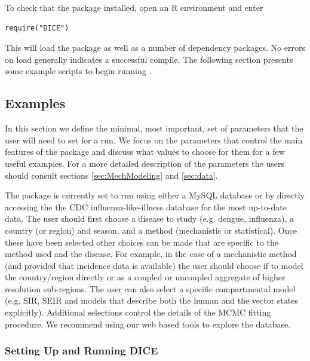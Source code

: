 \documentclass[a4paper]{article}
\begin{document}
To check that the package installed, open an R environment and enter
\begin{verbatim}
require("DICE")
\end{verbatim}
This will load the  package as well as a number of dependency packages.  No errors on load generally indicates a successful compile.  The following section presents some example scripts to begin running .

\subsection{Examples}
\label{sec:exmpl}
In this section we define the minimal, most important, set of  parameters that the user will need to set for a  run. We focus on the parameters that control the main features of the package and discuss what values to choose for them for a few useful examples.  For a more detailed description of the parameters the users should consult sections \ref{sec:MechModeling} and \ref{sec:data}.


The  package is currently set to run using either a MySQL database or by directly accessing the the CDC influenza-like-illness database for the most up-to-date data.  The user should first choose a disease to study (e.g. dengue, influenza), a country (or region) and season, and a method (mechanistic or statistical). Once these have been selected other choices can be made that are specific to the method used and the disease.  For example, in the case of a mechanistic method (and provided that incidence data is available) the user should choose if to model the country/region directly or as a coupled or uncoupled aggregate of higher resolution sub-regions.  The user can also select a specific compartmental model (e.g. SIR, SEIR and models that describe both the human and the vector states explicitly). Additional selections control the details of the MCMC fitting procedure. We recommend using our web based tools to explore the database.

\subsubsection{Setting Up and Running DICE}
\end{document}
